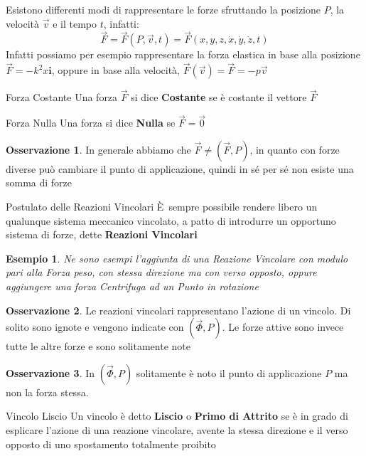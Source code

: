 \documentclass[11pt,a4paper,twoside]{article}
\newtheorem{es}{Esempio}
\theoremstyle{definition}
\newtheorem*{oss}{Osservazione}
\begin{document}
Esistono differenti modi di rappresentare le forze sfruttando la posizione $P$, la velocità $\vec v$ e il tempo $t$, infatti:
\[ \vec F = \vec F(P, \vec v, t) = \vec F(x,y,z,\dot x, \dot y, \dot z, t) \]
Infatti possiamo per esempio rappresentare la forza elastica in base alla posizione $\vec F = - k^2 x \mathbf i$, oppure in base alla velocità, $\vec F(\vec v) = \vec F = - p \vec v$

\begin{defn}{Forza Costante}{}
	Una forza $\vec F$ si dice \textbf{Costante} se è costante il vettore $\vec F$
\end{defn}

\begin{defn}{Forza Nulla}{}
	Una forza si dice \textbf{Nulla} se $\vec F = \vec 0$
\end{defn}

\begin{oss}
	In generale abbiamo che $\vec F \neq (\vec F, P)$, in quanto con forze diverse può cambiare il punto di applicazione, quindi in sé per sé non esiste una somma di forze
\end{oss}

\begin{thm}{Postulato delle Reazioni Vincolari}{}
	È sempre possibile rendere libero un qualunque sistema meccanico vincolato, a patto di introdurre un opportuno sistema di forze, dette \textbf{Reazioni Vincolari}
\end{thm}

\begin{es}
	Ne sono esempi l'aggiunta di una Reazione Vincolare con modulo pari alla Forza peso, con stessa direzione ma con verso opposto, oppure aggiungere una forza Centrifuga ad un Punto in rotazione
\end{es}

\begin{oss}
	Le reazioni vincolari rappresentano l'azione di un vincolo. Di solito sono ignote e vengono indicate con $(\vec \Phi, P)$. Le forze attive sono invece tutte le altre forze e sono solitamente note
\end{oss}

\begin{oss}
	In $(\vec\Phi, P)$ solitamente è noto il punto di applicazione $P$ ma non la forza stessa.
\end{oss}

\begin{defn}{Vincolo Liscio}{}
	Un vincolo è detto \textbf{Liscio} o \textbf{Primo di Attrito} se è in grado di esplicare l'azione di una reazione vincolare, avente la stessa direzione e il verso opposto di uno spostamento totalmente proibito
\end{defn}
\end{document}
